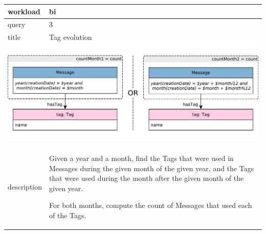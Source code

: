 \renewcommand*{\arraystretch}{1.1}

\noindent\begin{tabularx}{17cm}{|p{1.95cm}|X|}
	\hline
	workload    & bi \\ \hline
%
	query       & 3 \\ \hline
%
	title       & Tag evolution \\ \hline
	\multicolumn{2}{|c|}{ \includegraphics[scale=\patternscale,margin=0cm .2cm]{patterns/bi03}} \\ \hline
	description & Given a year and a month, find the Tags that were used in Messages
during the given month of the given year, and the Tags that were used
during the month after the given month of the given year.

For both months, compute the count of Messages that used each of the
Tags.
 \\ \hline
	

\end{tabularx}
